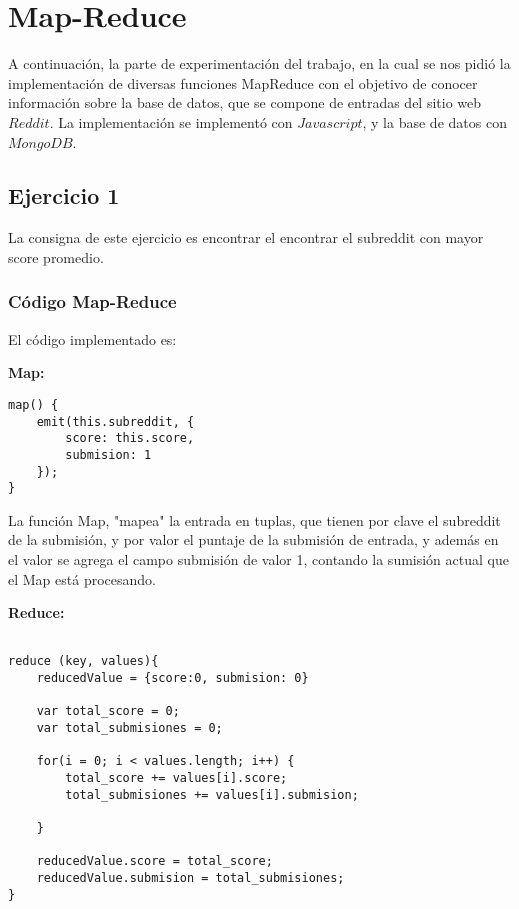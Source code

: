 \section{Map-Reduce}

A continuaci\'on, la parte de experimentaci\'on del trabajo, en la cual se nos pidi\'o la implementaci\'on de diversas funciones MapReduce con el objetivo de conocer informaci\'on sobre la base de datos, que se compone de entradas del sitio web $Reddit$. La implementaci\'on se implement\'o con $Javascript$, y la base de datos con $MongoDB$.

\subsection{Ejercicio 1}

La consigna de este ejercicio es encontrar el encontrar el subreddit con mayor score promedio.

\subsubsection{C\'odigo Map-Reduce}

El c\'odigo implementado es:

\textbf{Map:}

\begin{lstlisting}
map() {
    emit(this.subreddit, {
    	score: this.score,
    	submision: 1
    });
}

\end{lstlisting}

La funci\'on Map, "mapea"  la entrada en tuplas, que tienen por clave el subreddit de la submisi\'on, y por valor el puntaje de la submisi\'on de entrada, y adem\'as en el valor se agrega el campo submisi\'on de valor 1, contando la sumisi\'on actual que el Map est\'a procesando.

\vspace{2mm}

\textbf{Reduce:}

\begin{lstlisting}

reduce (key, values){
    reducedValue = {score:0, submision: 0}

    var total_score = 0;
    var total_submisiones = 0;

	for(i = 0; i < values.length; i++) {
		total_score += values[i].score;
		total_submisiones += values[i].submision;

	}

	reducedValue.score = total_score;
	reducedValue.submision = total_submisiones;
}

\end{lstlisting}

